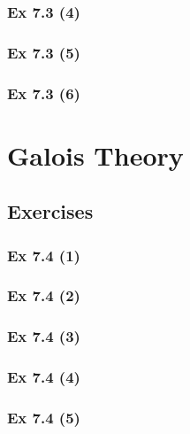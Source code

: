 \subsubsection{Ex 7.3 (4)}\label{sec:Ex_7.3.4}

\subsubsection{Ex 7.3 (5)}\label{sec:Ex_7.3.5}

\subsubsection{Ex 7.3 (6)}\label{sec:Ex_7.3.6}

\newpage		%

\section{Galois Theory}\label{sec:7.4}
\subsection{Exercises}\label{sec:7.4_Exercises}

\subsubsection{Ex 7.4 (1)}\label{sec:Ex_7.4.1}

\subsubsection{Ex 7.4 (2)}\label{sec:Ex_7.4.2}

\subsubsection{Ex 7.4 (3)}\label{sec:Ex_7.4.3}

\subsubsection{Ex 7.4 (4)}\label{sec:Ex_7.4.4}

\subsubsection{Ex 7.4 (5)}\label{sec:Ex_7.4.5}

